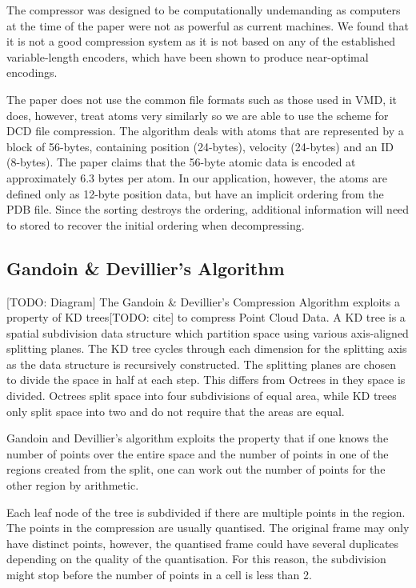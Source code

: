 \documentclass[a4paper,11pt]{report}
\begin{document}
The compressor was designed to be computationally undemanding as computers at the time of the paper were not as powerful as current machines. We found that it is not a good compression system as it is not based on any of the established variable-length encoders, which have been shown to produce near-optimal encodings.

The paper does not use the common file formats such as those used in VMD, it does, however, treat atoms very similarly so we are able to use the scheme for DCD file compression. The algorithm deals with atoms that are represented by a block of 56-bytes, containing position (24-bytes), velocity (24-bytes) and an ID (8-bytes). The paper claims that the 56-byte atomic data is encoded at approximately 6.3 bytes per atom. In our application, however, the atoms are defined only as 12-byte position data, but have an implicit ordering from the PDB file. Since the sorting destroys the ordering, additional information will need to stored to recover the initial ordering when decompressing.

\subsection{Gandoin \& Devillier's Algorithm}

[TODO: Diagram]
The Gandoin \& Devillier's Compression Algorithm exploits a property of KD trees[TODO: cite] to compress Point Cloud Data.\cite{devillers2000gci} A KD tree is a spatial subdivision data structure which partition space using various axis-aligned splitting planes. The KD tree cycles through each dimension for the splitting axis as the data structure is recursively constructed. The splitting planes are chosen to divide the space in half at each step. This differs from Octrees in they space is divided. Octrees split space into four subdivisions of equal area, while KD trees only split space into two and do not require that the areas are equal.

Gandoin and Devillier's algorithm exploits the property that if one knows the number of points over the entire space and the number of points in one of the regions created from the split, one can work out the number of points for the other region by arithmetic.

Each leaf node of the tree is subdivided if there are multiple points in the region. The points in the compression are usually quantised. The original frame may only have distinct points, however, the quantised frame could have several duplicates depending on the quality of the quantisation. For this reason, the subdivision might stop before the number of points in a cell is less than 2.
\end{document}
